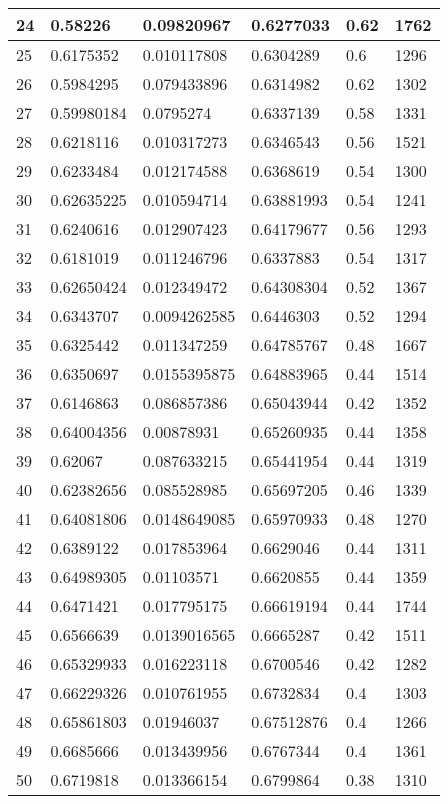 \begin{longtable}{|l|l|l|l|l|l|}
24 & 0.58226 & 0.09820967 & 0.6277033 & 0.62 & 1762 \\ \hline 
25 & 0.6175352 & 0.010117808 & 0.6304289 & 0.6 & 1296 \\ \hline 
26 & 0.5984295 & 0.079433896 & 0.6314982 & 0.62 & 1302 \\ \hline 
27 & 0.59980184 & 0.0795274 & 0.6337139 & 0.58 & 1331 \\ \hline 
28 & 0.6218116 & 0.010317273 & 0.6346543 & 0.56 & 1521 \\ \hline 
29 & 0.6233484 & 0.012174588 & 0.6368619 & 0.54 & 1300 \\ \hline 
30 & 0.62635225 & 0.010594714 & 0.63881993 & 0.54 & 1241 \\ \hline 
31 & 0.6240616 & 0.012907423 & 0.64179677 & 0.56 & 1293 \\ \hline 
32 & 0.6181019 & 0.011246796 & 0.6337883 & 0.54 & 1317 \\ \hline 
33 & 0.62650424 & 0.012349472 & 0.64308304 & 0.52 & 1367 \\ \hline 
34 & 0.6343707 & 0.0094262585 & 0.6446303 & 0.52 & 1294 \\ \hline 
35 & 0.6325442 & 0.011347259 & 0.64785767 & 0.48 & 1667 \\ \hline 
36 & 0.6350697 & 0.0155395875 & 0.64883965 & 0.44 & 1514 \\ \hline 
37 & 0.6146863 & 0.086857386 & 0.65043944 & 0.42 & 1352 \\ \hline 
38 & 0.64004356 & 0.00878931 & 0.65260935 & 0.44 & 1358 \\ \hline 
39 & 0.62067 & 0.087633215 & 0.65441954 & 0.44 & 1319 \\ \hline 
40 & 0.62382656 & 0.085528985 & 0.65697205 & 0.46 & 1339 \\ \hline 
41 & 0.64081806 & 0.0148649085 & 0.65970933 & 0.48 & 1270 \\ \hline 
42 & 0.6389122 & 0.017853964 & 0.6629046 & 0.44 & 1311 \\ \hline 
43 & 0.64989305 & 0.01103571 & 0.6620855 & 0.44 & 1359 \\ \hline 
44 & 0.6471421 & 0.017795175 & 0.66619194 & 0.44 & 1744 \\ \hline 
45 & 0.6566639 & 0.0139016565 & 0.6665287 & 0.42 & 1511 \\ \hline 
46 & 0.65329933 & 0.016223118 & 0.6700546 & 0.42 & 1282 \\ \hline 
47 & 0.66229326 & 0.010761955 & 0.6732834 & 0.4 & 1303 \\ \hline 
48 & 0.65861803 & 0.01946037 & 0.67512876 & 0.4 & 1266 \\ \hline 
49 & 0.6685666 & 0.013439956 & 0.6767344 & 0.4 & 1361 \\ \hline 
50 & 0.6719818 & 0.013366154 & 0.6799864 & 0.38 & 1310 \\ \hline 
\end{longtable}
